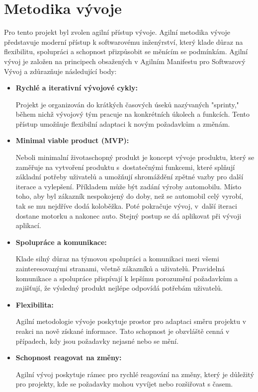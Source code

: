 \section{Metodika vývoje}

Pro tento projekt byl zvolen agilní přístup vývoje. Agilní metodika vývoje představuje moderní přístup k softwarovému inženýrství, který klade důraz na flexibilitu, spolupráci a schopnost přizpůsobit se měnícím se podmínkám. Agilní vývoj je založen na principech obsažených v Agilním Manifestu pro Softwarový Vývoj a zdůrazňuje následující body: \cite{agilemanifesto} \cite{mijacobs_planovani_2023}

\begin{itemize}
  \item \textbf{Rychlé a iterativní vývojové cykly:} 
  
  Projekt je organizován do krátkých časových úseků nazývaných "sprinty," během nichž vývojový tým pracuje na konkrétních úkolech a funkcích. Tento přístup umožňuje flexibilní adaptaci k novým požadavkům a změnám.

  \item \textbf{Minimal viable product (MVP):} 
  
  Neboli minimalní životaschopný produkt je koncept vývoje produktu, který se zaměřuje na vytvoření produktu s~dostatečnými funkcemi, které splňují základní potřeby uživatelů a umožňují shromáždění zpětné vazby pro další iterace a vylepšení. Příkladem může být zadání výroby automobilu. Místo toho, aby byl zákazník nespokojený do doby, než se automobil celý vyrobí, tak se mu nejdříve dodá koloběžka. Poté pokračuje vývoj, v~další iteraci dostane motorku a nakonec auto. Stejný postup se dá aplikovat při vývoji aplikací.

  \item \textbf{Spolupráce a komunikace:} 
  
  Klade silný důraz na týmovou spolupráci a komunikaci mezi všemi zainteresovanými stranami, včetně zákazníků a uživatelů. Pravidelná komunikace a spolupráce přispívají k lepšímu porozumění požadavkům a zajišťují, že výsledný produkt nejlépe odpovídá potřebám uživatelů.

  \item \textbf{Flexibilita:} 
  
  Agilní metodologie vývoje poskytuje prostor pro adaptaci směru projektu v reakci na nově získané informace. Tato schopnost je obzvláště cenná v případech, kdy jsou požadavky nejasné nebo se mění.

  \item \textbf{Schopnost reagovat na změny:} 
  
  Agilní vývoj poskytuje rámec pro rychlé reagování na změny, který je důležitý pro projekty, kde se požadavky mohou vyvíjet nebo rozšiřovat s časem.

\end{itemize}

